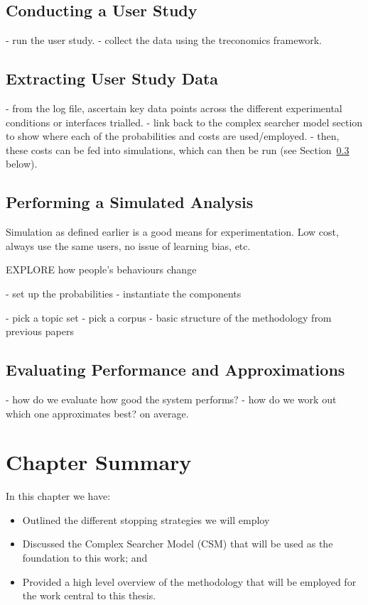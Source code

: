 \subsection{Conducting a User Study}
- run the user study.
- collect the data using the treconomics framework.

\subsection{Extracting User Study Data}
- from the log file, ascertain key data points across the different experimental conditions or interfaces trialled.
- link back to the complex searcher model section to show where each of the probabilities and costs are used/employed.
- then, these costs can be fed into simulations, which can then be run (see Section~\ref{sec:proposal:method:simulations} below).

\subsection{Performing a Simulated Analysis}\label{sec:proposal:method:simulations}
Simulation as defined earlier is a good means for experimentation.
Low cost, always use the same users, no issue of learning bias, etc.

EXPLORE how people's behaviours change

- set up the probabilities
- instantiate the components

- pick a topic set
- pick a corpus
- basic structure of the methodology from previous papers

\subsection{Evaluating Performance and Approximations}
- how do we evaluate how good the system performs?
- how do we work out which one approximates best? on average.



\section{Chapter Summary}
In this chapter we have:

\begin{itemize}
    
    \item{Outlined the different stopping strategies we will employ}
    \item{Discussed the Complex Searcher Model (CSM) that will be used as the foundation to this work; and}
    \item{Provided a high level overview of the methodology that will be employed for the work central to this thesis.}
    
\end{itemize}